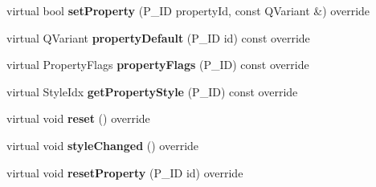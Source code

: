 \begin{DoxyCompactItemize}
virtual bool {\bfseries set\+Property} (P\+\_\+\+ID property\+Id, const Q\+Variant \&) override
\item 
\mbox{\label{class_ms_1_1_lyrics_ac99ba381e2c3e14f805c56ac93421f76}} 
virtual Q\+Variant {\bfseries property\+Default} (P\+\_\+\+ID id) const override
\item 
\mbox{\label{class_ms_1_1_lyrics_a3b5b7e223b23b8e141d7ffb035229899}} 
virtual Property\+Flags {\bfseries property\+Flags} (P\+\_\+\+ID) const override
\item 
\mbox{\label{class_ms_1_1_lyrics_adf97d64f347ce52652af8c52e32b616b}} 
virtual Style\+Idx {\bfseries get\+Property\+Style} (P\+\_\+\+ID) const override
\item 
\mbox{\label{class_ms_1_1_lyrics_a60b8a8a715f9282afb466565597595f5}} 
virtual void {\bfseries reset} () override
\item 
\mbox{\label{class_ms_1_1_lyrics_a9bf46d4749585044e0ae6b9ace3d1550}} 
virtual void {\bfseries style\+Changed} () override
\item 
\mbox{\label{class_ms_1_1_lyrics_ae681cfa4ea9a6b49fafa08f1a567d94d}} 
virtual void {\bfseries reset\+Property} (P\+\_\+\+ID id) override
\end{DoxyCompactItemize}
